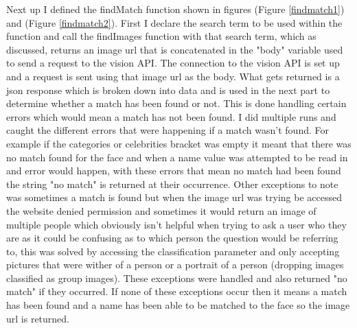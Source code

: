 \documentclass[12pt,a4paper]{article}
\begin{document}
Next up I defined the findMatch function shown in figures (Figure \ref{findmatch1}) and (Figure \ref{findmatch2}). First I declare the search term to be used within the function and call the findImages function with that search term, which as discussed, returns an image url that is concatenated in the "body" variable used to send a request to the vision API. The connection to the vision API is set up and a request is sent using that image url as the body. What gets returned is a json response which is broken down into data and is used in the next part to determine whether a match has been found or not. This is done handling certain errors which would mean a match has not been found. I did multiple runs and caught the different errors that were happening if a match wasn't found. For example if the categories or celebrities bracket was empty it meant that there was no match found for the face and when a name value was attempted to be read in and error would happen, with these errors that mean no match had been found the string "no match" is returned at their occurrence. Other exceptions to note was sometimes a match is found but when the image url was trying be accessed the website denied permission and sometimes it would return an image of multiple people which obviously isn't helpful when trying to ask a user who they are as it could be confusing as to which person the question would be referring to, this was solved by accessing the classification parameter and only accepting pictures that were wither of a person or a portrait of a person (dropping images classified as group images). These exceptions were handled and also returned "no match" if they occurred. If none of these exceptions occur then it means a match has been found and a name has been able to be matched to the face so the image url is returned.
\end{document}
